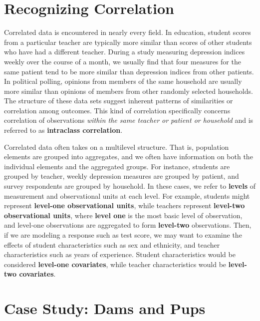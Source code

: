 \documentclass[
]{krantz}
\begin{document}
\section{Recognizing Correlation}\label{recognizing-correlation}

Correlated data is encountered in nearly every field. In education, student scores from a particular teacher are typically more similar than scores of other students who have had a different teacher. During a study measuring depression indices weekly over the course of a month, we usually find that four measures for the same patient tend to be more similar than depression indices from other patients. In political polling, opinions from members of the same household are usually more similar than opinions of members from other randomly selected households. The structure of these data sets suggest inherent patterns of similarities or correlation among outcomes. This kind of correlation specifically concerns correlation of observations \emph{within the same teacher or patient or household} and is referred to as \textbf{intraclass correlation}. 

Correlated data often takes on a multilevel structure. That is, population elements are grouped into aggregates, and we often have information on both the individual elements and the aggregated groups. For instance, students are grouped by teacher, weekly depression measures are grouped by patient, and survey respondents are grouped by household. In these cases, we refer to \textbf{levels}  of measurement and observational units at each level. For example, students might represent \textbf{level-one observational units}, while teachers represent \textbf{level-two observational units}, where \textbf{level one} is the most basic level of observation, and level-one observations are aggregated to form \textbf{level-two} observations. Then, if we are modeling a response such as test score, we may want to examine the effects of student characteristics such as sex and ethnicity, and teacher characteristics such as years of experience. Student characteristics would be considered \textbf{level-one covariates}, while teacher characteristics would be \textbf{level-two covariates}.

\section{Case Study: Dams and Pups}\label{case-study-dams-and-pups}
\end{document}
